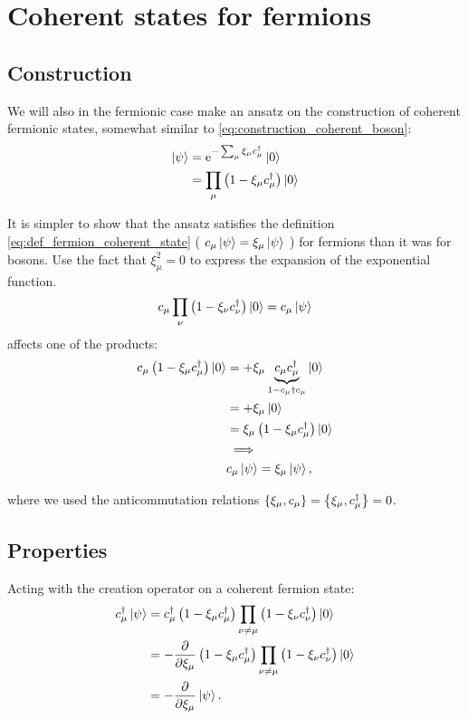 \section{Coherent states for fermions}

\subsection{Construction}

We will also in the fermionic case make an ansatz on the construction of coherent fermionic states, somewhat similar to \eqref{eq:construction_coherent_boson}:
\begin{align}
\ket \psi &= \mathrm{e}^{-\sum_\mu\xi_\mu c_\mu^\dagger}\ket 0 \\
&= \prod_\mu \left(1-\xi_\mu c_\mu^\dagger\right)\ket 0
\end{align}

It is simpler to show that the ansatz satisfies the definition \eqref{eq:def_fermion_coherent_state} ( \( c_\mu \ket{\psi} = \xi_\mu\ket{\psi}\) ) for fermions than it was for bosons. Use the fact that \(\xi_\mu^2 = 0\) to express the expansion of the exponential function. 
\begin{equation}
c_\mu\prod_\nu\left(1-\xi_\nu c_\nu^\dagger\right)\ket 0 = c_\mu \ket \psi
\end{equation}
affects one of the products:
\begin{align}
c_\mu\left(1-\xi_\mu c_\mu^\dagger\right)\ket 0 &= +\xi_\mu \underbrace{c_\mu c_\mu^\dagger}_{1-c_\mu\dagger c_\mu}\ket 0 \\
&= +\xi_\mu \ket 0  \\
&= \xi_\mu\left(1-\xi_\mu c_\mu^\dagger\right)\ket 0 \\
&\implies \nonumber\\
 &c_\mu\ket \psi = \xi_\mu\ket\psi,
\end{align} 

where we used the anticommutation relations \(\acomm{\xi_\mu}{c_\mu} = \acomm{\xi_\mu}{c_\mu^\dagger} =0\).

\subsection{Properties}

Acting with the creation operator on a coherent fermion state:
\begin{align*}
c_\mu^\dagger\ket\psi &= c_\mu^\dagger\left(1-\xi_\mu c_\mu^\dagger\right)\prod_{\nu \ne \mu}\left(1-\xi_\nu c_\nu^\dagger\right)\ket 0\\
&= -\pdv{\xi_\mu}\left(1-\xi_\mu c_\mu^\dagger\right)\prod_{\nu \ne \mu}\left(1-\xi_\nu c_\nu^\dagger\right)\ket 0 \\
&= -\pdv{\xi_\mu}\ket \psi.
\end{align*}

